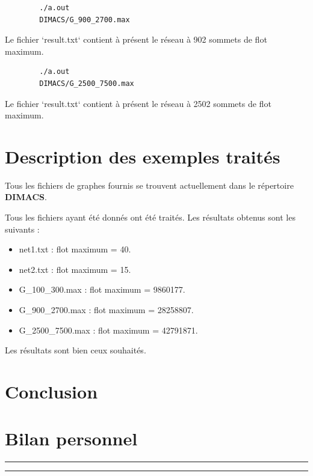 \documentclass[11pt, a4paper]{report}
\begin{document}
	\begin{lstlisting}
		./a.out
		DIMACS/G_900_2700.max
	\end{lstlisting}
	Le fichier `result.txt` contient à présent le réseau à 902 sommets de flot maximum.
	
	\begin{lstlisting}
		./a.out
		DIMACS/G_2500_7500.max
	\end{lstlisting}
	Le fichier `result.txt` contient à présent le réseau à 2502 sommets de flot maximum.
	
	
	
	
	\chapter{Description des exemples traités}
	
	Tous les fichiers de graphes fournis se trouvent actuellement dans le répertoire \textbf{DIMACS}.
	
	Tous les fichiers ayant été donnés ont été traités. Les résultats obtenus sont les suivants :
	\begin{itemize}
        \item net1.txt : flot maximum = 40.
        \item net2.txt : flot maximum = 15.
        \item G_100_300.max : flot maximum = 9860177.
        \item G_900_2700.max : flot maximum = 28258807.
        \item G_2500_7500.max : flot maximum = 42791871.
	\end{itemize}
	Les résultats sont bien ceux souhaités.
	
	
	\chapter*{Conclusion}
	
	
	\chapter*{Bilan personnel}
	
	
	
	
	
	
	
	
	
	\pagebreak
	
	\vspace{900px}
	
	\rule{1\textwidth}{.8pt}
	\rule{1\textwidth}{.8pt}
	
\end{document}
